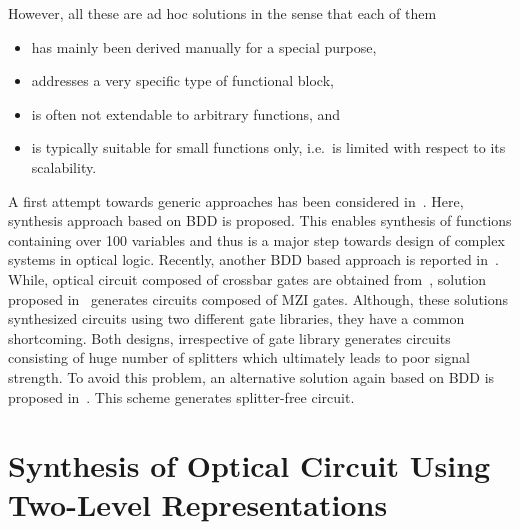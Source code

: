 \documentclass[10pt,letterpaper,twoside,openright]{book}
\begin{document}
However, all these are ad hoc solutions in the sense that each of them 
\begin{itemize}
\item has mainly been derived manually for a special purpose,
\item addresses a very specific type of functional block, 
\item is often not extendable to arbitrary functions, and
\item is typically suitable for small functions only, i.e.~is limited 
with respect to its scalability. %
\end{itemize}
A first attempt towards generic approaches has been considered in~\cite{Condrat2011}. Here, synthesis approach based on BDD is proposed. This enables synthesis of functions containing over 100 variables and thus is a major step towards design of complex systems in optical logic. Recently, another BDD based approach is reported in~\cite{TODO}. While, optical circuit composed of crossbar gates are obtained from~\cite{Condrat2011}, solution proposed in~\cite{TODO} generates circuits composed of MZI gates. Although, these solutions synthesized circuits using two different gate libraries, they have a common shortcoming. Both designs, irrespective of gate library generates circuits consisting of huge number of splitters which ultimately leads to poor signal strength. To avoid this problem, an alternative solution again based on BDD is proposed in~\cite{TODO}. This scheme generates splitter-free circuit.  


\chapter{Synthesis of Optical Circuit Using Two-Level Representations}~\label{ch:synth-two-level}
\end{document}
